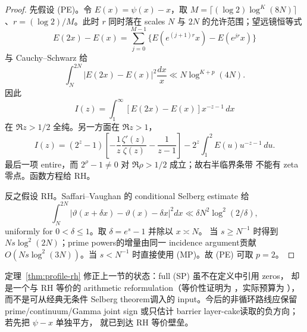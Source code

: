 \begin{proof}
先假设 (PE)。令 $E(x)=\psi(x)-x$，取
$M=\lceil(\log2)\log^K(8N)\rceil$、$r=(\log2)/M$。此时 $r$ 同时落在
scales $N$ 与 $2N$ 的允许范围；望远镜恒等式
\[
 E(2x)-E(x)=\sum_{j=0}^{M-1}
 \{E(e^{(j+1)r}x)-E(e^{jr}x)\}
\]
与 Cauchy--Schwarz 给
\[
 \int_N^{2N}|E(2x)-E(x)|^2\frac{dx}{x}
 \ll N\log^{K+p}(4N).                           \tag{FD}
\]
因此
\[
 I(z)=\int_1^\infty [E(2x)-E(x)]x^{-z-1}\,dx
\]
在 $\Re z>1/2$ 全纯。另一方面在 $\Re z>1$，
\[
 I(z)=(2^z-1)\left[-\frac1z\frac{\zeta'(z)}{\zeta(z)}
                  -\frac1{z-1}\right]
      -2^z\int_1^2E(u)u^{-z-1}\,du.             \tag{ME}
\]
最后一项 entire，而 $2^\rho-1\neq0$ 对 $\Re\rho>1/2$ 成立；故右半临界条带
不能有 zeta 零点。函数方程给 RH。

反之假设 RH。Saffari--Vaughan 的 conditional Selberg estimate
\cite{SaffariVaughan} 给
\[
 \int_N^{2N}|\vartheta(x+\delta x)-\vartheta(x)-\delta x|^2dx
 \ll\delta N^2\log^2(2/\delta),                 \tag{SVR}
\]
uniformly for $0<\delta\leq1$。取 $\delta=e^s-1$ 并除以 $x\asymp N$。
当 $s\geq N^{-1}$ 时得到 $Ns\log^2(2N)$；prime powers的增量由同一 incidence
argument贡献 $O(Ns\log^2(3N))$。当 $s<N^{-1}$ 时直接使用 (MP)。故 (PE)
可取 $p=2$。
\end{proof}

定理~\ref{thm:profile-rh} 修正上一节的状态：full (SP) 虽不在定义中引用 zeros，
却是一个与 RH 等价的 arithmetic reformulation（等价性证明为 \statusT{}，实际预算为 \statusO{}），而不是可从经典无条件
Selberg theorem调入的 input。今后的非循环路线应保留 prime/continuum/Gamma
joint sign 或只估计 barrier layer-cake读取的负方向；若先把 $\psi-x$ 单独平方，
就已到达 RH 等价壁垒。
